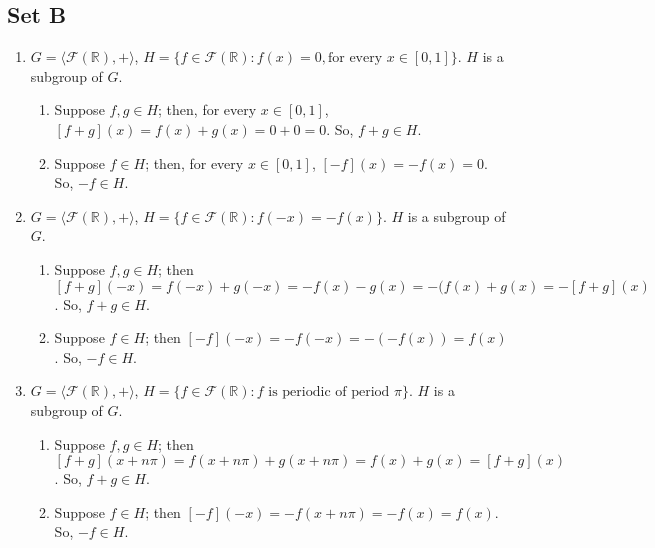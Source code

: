 \documentclass{article}
\begin{document}
\subsection*{Set B}
\begin{enumerate}
    \item $G = \langle \mathscr{F}(\mathbb{R}), + \rangle$, $H = \{f \in \mathscr{F}(\mathbb{R}): f(x) = 0, \text{for every $x \in [0, 1]$}\}$. $H$ is a subgroup of $G$.
        \begin{enumerate}[label=(\roman*)]
            \item Suppose $f, g \in H$; then, for every $x \in [0, 1]$, $[f + g](x) = f(x) + g(x) = 0 + 0 = 0$. So, $f + g \in H$.
            \item Suppose $f \in H$; then, for every $x \in [0, 1]$, $[-f](x) = -f(x) = 0$. So, $-f \in H$.
        \end{enumerate}
        \item $G = \langle \mathscr{F}(\mathbb{R}), + \rangle$, $H = \{f \in \mathscr{F}(\mathbb{R}): f(-x) = -f(x)\}$. $H$ is a subgroup of $G$.
            \begin{enumerate}[label=(\roman*)]
                \item Suppose $f, g \in H$; then $[f + g](-x) = f(-x) + g(-x) = -f(x) - g(x) = -(f(x) + g(x) = -[f + g](x)$. So, $f + g \in H$.
                \item Suppose $f \in H$; then $[-f](-x) = -f(-x) = -(-f(x)) = f(x)$. So, $-f \in H$.
            \end{enumerate}    
        \item $G = \langle \mathscr{F}(\mathbb{R}), + \rangle$, $H = \{f \in \mathscr{F}(\mathbb{R}): \text{$f$ is periodic of period $\pi$}\}$. $H$ is a subgroup of $G$.
            \begin{enumerate}[label=(\roman*)]
                \item Suppose $f, g \in H$; then $[f + g](x + n\pi) = f(x + n\pi) + g(x + n\pi) = f(x) + g(x) = [f + g](x)$. So, $f + g \in H$.
                \item Suppose $f \in H$; then $[-f](-x) = -f(x + n\pi) = -f(x) = f(x)$. So, $-f \in H$.
            \end{enumerate}    
\end{enumerate}
\end{document}
